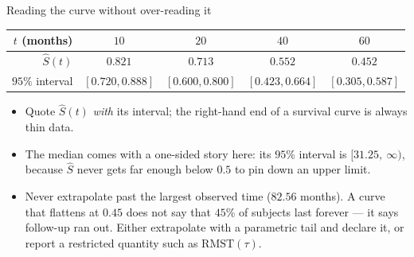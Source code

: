 \documentclass[aspectratio=169,11pt]{beamer}
\begin{document}
\begin{frame}{Reading the curve without over-reading it}
  \begin{center}\footnotesize
  \begin{tabular}{@{}rcccc@{}}
    \toprule
    $t$ (months) & $10$ & $20$ & $40$ & $60$ \\
    \midrule
    $\hat S(t)$ & $0.821$ & $0.713$ & $0.552$ & $0.452$ \\
    $95\%$ interval & $[0.720,0.888]$ & $[0.600,0.800]$ & $[0.423,0.664]$ & $[0.305,0.587]$ \\
    \bottomrule
  \end{tabular}
  \end{center}
  \begin{readme}
    \begin{itemize}
      \item Quote $\hat S(t)$ \emph{with} its interval; the right-hand end of a survival
            curve is always thin data.
      \item The median comes with a one-sided story here: its $95\%$ interval is
            $[31.25,\ \infty)$, because $\hat S$ never gets far enough below $0.5$ to
            pin down an upper limit.
      \item Never extrapolate past the largest observed time ($82.56$ months). A curve
            that flattens at $0.45$ does not say that $45\%$ of subjects last forever ---
            it says follow-up ran out. Either extrapolate with a parametric tail and
            declare it, or report a restricted quantity such as $\mathrm{RMST}(\tau)$.
    \end{itemize}
  \end{readme}
\end{frame}
\end{document}
